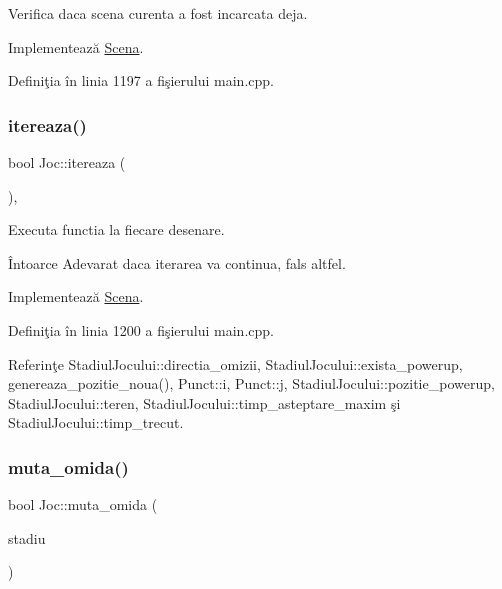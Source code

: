 Verifica daca scena curenta a fost incarcata deja. 

Implementează \hyperlink{classScena_ac8de771024795dffa0e5feb8dba881ff}{Scena}.



Definiţia în linia 1197 a fişierului main.\+cpp.

\mbox{\label{classJoc_a5b8d52f928137512921eee184ca04fec}} 
\subsubsection{\texorpdfstring{itereaza()}{itereaza()}}
{\footnotesize\ttfamily bool Joc\+::itereaza (\begin{DoxyParamCaption}\item[{\hyperlink{classStadiulJocului}{Stadiul\+Jocului} \&}]{ }\end{DoxyParamCaption})\hspace{0.3cm}{\ttfamily [override]}, {\ttfamily [virtual]}}



Executa functia la fiecare \textquotesingle{}desenare\textquotesingle{}. 

\begin{DoxyReturn}{Întoarce}
Adevarat daca iterarea va continua, fals altfel. 
\end{DoxyReturn}


Implementează \hyperlink{classScena_a9e5fcc831ed410b5b2422231ede746ee}{Scena}.



Definiţia în linia 1200 a fişierului main.\+cpp.



Referinţe Stadiul\+Jocului\+::directia\+\_\+omizii, Stadiul\+Jocului\+::exista\+\_\+powerup, genereaza\+\_\+pozitie\+\_\+noua(), Punct\+::i, Punct\+::j, Stadiul\+Jocului\+::pozitie\+\_\+powerup, Stadiul\+Jocului\+::teren, Stadiul\+Jocului\+::timp\+\_\+asteptare\+\_\+maxim şi Stadiul\+Jocului\+::timp\+\_\+trecut.

\mbox{\label{classJoc_afd69d2cd19f6d2ac2b1a42a4685349e6}} 
\subsubsection{\texorpdfstring{muta\+\_\+omida()}{muta\_omida()}}
{\footnotesize\ttfamily bool Joc\+::muta\+\_\+omida (\begin{DoxyParamCaption}\item[{\hyperlink{classStadiulJocului}{Stadiul\+Jocului} \&}]{stadiu }\end{DoxyParamCaption})\hspace{0.3cm}{\ttfamily [private]}}

